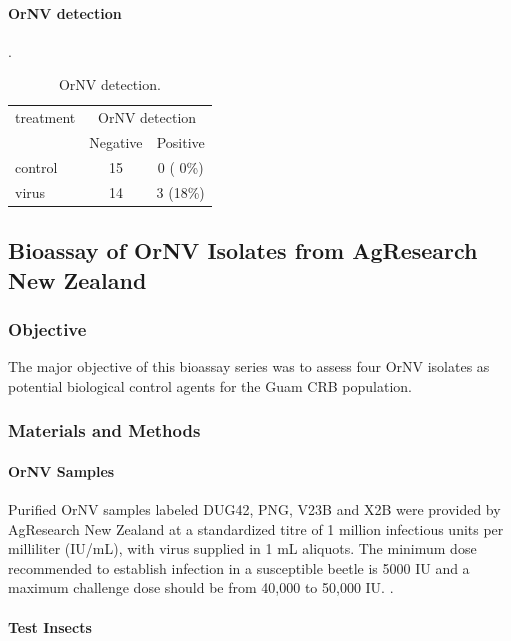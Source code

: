\documentclass[12pt,letterpaper,english,bibliography=totocnumbered, abstract=on]{scrartcl}
\begin{document}
\clearpage
\paragraph{OrNV detection}.

\begin{table}[H]
	\centering
	\caption{OrNV detection.}
	\label{ornv detection}
	\begin{tabular}{lcc}
		\hline
		treatment  & \multicolumn{2}{c}{OrNV detection} \\ \cline{2-3}
		& Negative & Positive \\
		\hline
		control    & 15 & 0 ( 0\%)\\
		virus      & 14 & 3 (18\%)\\
		\hline
	\end{tabular}
\end{table}

\clearpage
\subsection{Bioassay of OrNV Isolates from AgResearch New Zealand}

\subsubsection{Objective}

The major objective of this bioassay series was to assess four OrNV isolates as potential biological control agents for the Guam CRB population. 

\subsubsection{Materials and Methods}

\paragraph{OrNV Samples}

Purified OrNV samples labeled DUG42, PNG, V23B and X2B were provided by AgResearch New Zealand at a standardized titre of 1 million infectious units per milliliter (IU/mL), with virus supplied in 1 mL aliquots. The minimum dose recommended to establish infection in a susceptible beetle is 5000 IU and a maximum challenge dose should be from 40,000 to 50,000 IU. \cite{AgResearch2023-OrNV-prep2023}.

\paragraph{Test Insects}
\end{document}
